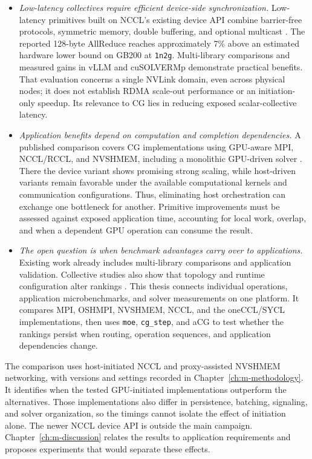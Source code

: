 \begin{itemize}
    \item \emph{Low-latency collectives require efficient device-side synchronization.}
    Low-latency primitives built on NCCL's existing device API combine barrier-free protocols, symmetric memory, double buffering, and optional multicast \cite{shen_every_2026}. The reported 128-byte AllReduce reaches approximately 7\% above an estimated hardware lower bound on GB200 at \texttt{1n2g}. Multi-library comparisons and measured gains in vLLM and cuSOLVERMp demonstrate practical benefits. That evaluation concerns a single NVLink domain, even across physical nodes; it does not establish RDMA scale-out performance or an initiation-only speedup. Its relevance to CG lies in reducing exposed scalar-collective latency.

    \item \emph{Application benefits depend on computation and completion dependencies.}
    A published comparison covers CG implementations using GPU-aware MPI, NCCL/RCCL, and NVSHMEM, including a monolithic GPU-driven solver \cite{trotter_cpu-_2025}. There the device variant shows promising strong scaling, while host-driven variants remain favorable under the available computational kernels and communication configurations. Thus, eliminating host orchestration can exchange one bottleneck for another. Primitive improvements must be assessed against exposed application time, accounting for local work, overlap, and when a dependent GPU operation can consume the result.

    \item \emph{The open question is when benchmark advantages carry over to applications.}
    Existing work already includes multi-library comparisons and application validation. Collective studies also show that topology and runtime configuration alter rankings \cite{desensi_exploring_2024,pasqualoni_pico_2026}. This thesis connects individual operations, application microbenchmarks, and solver measurements on one platform. It compares MPI, OSHMPI, NVSHMEM, NCCL, and the oneCCL/SYCL implementations, then uses \texttt{moe}, \texttt{cg\_step}, and aCG to test whether the rankings persist when routing, operation sequences, and application dependencies change.
\end{itemize}

The comparison uses host-initiated NCCL and proxy-assisted NVSHMEM networking, with versions and settings recorded in Chapter~\ref{ch:m-methodology}. It identifies when the tested GPU-initiated implementations outperform the alternatives. Those implementations also differ in persistence, batching, signaling, and solver organization, so the timings cannot isolate the effect of initiation alone. The newer NCCL device API is outside the main campaign. Chapter~\ref{ch:m-discussion} relates the results to application requirements and proposes experiments that would separate these effects.
